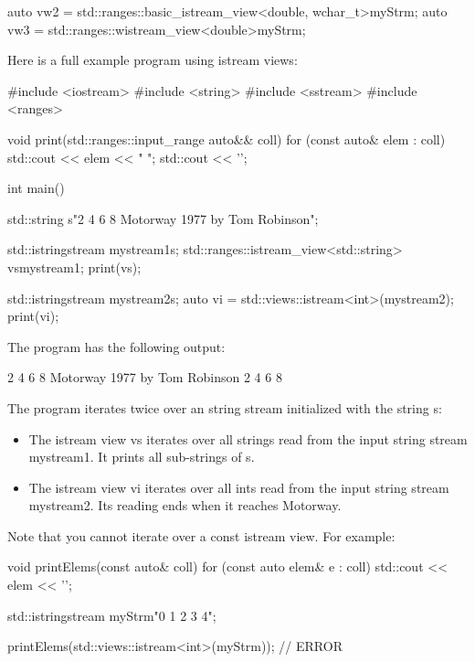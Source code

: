 \begin{cpp}
auto vw2 = std::ranges::basic_istream_view<double, wchar_t>{myStrm};
auto vw3 = std::ranges::wistream_view<double>{myStrm};
\end{cpp}

Here is a full example program using istream views:


\begin{cpp}
#include <iostream>
#include <string>
#include <sstream>
#include <ranges>

void print(std::ranges::input_range auto&& coll)
{
	for (const auto& elem : coll) {
		std::cout << elem << " ";
	}
	std::cout << '\n';
}

int main()
{
	std::string s{"2 4 6 8 Motorway 1977 by Tom Robinson"};
	
	std::istringstream mystream1{s};
	std::ranges::istream_view<std::string> vs{mystream1};
	print(vs);
	
	std::istringstream mystream2{s};
	auto vi = std::views::istream<int>(mystream2);
	print(vi);
}
\end{cpp}

The program has the following output:

\begin{shell}
2 4 6 8 Motorway 1977 by Tom Robinson
2 4 6 8
\end{shell}

The program iterates twice over an string stream initialized with the string s:

\begin{itemize}
\item
The istream view vs iterates over all strings read from the input string stream mystream1. It prints all sub-strings of s.

\item
The istream view vi iterates over all ints read from the input string stream mystream2. Its reading ends when it reaches Motorway.
\end{itemize}


Note that you cannot iterate over a const istream view. For example:

\begin{cpp}
void printElems(const auto& coll) {
	for (const auto elem& e : coll) {
		std::cout << elem << '\n';
	}
}

std::istringstream myStrm{"0 1 2 3 4"};

printElems(std::views::istream<int>(myStrm)); // ERROR
\end{cpp}

